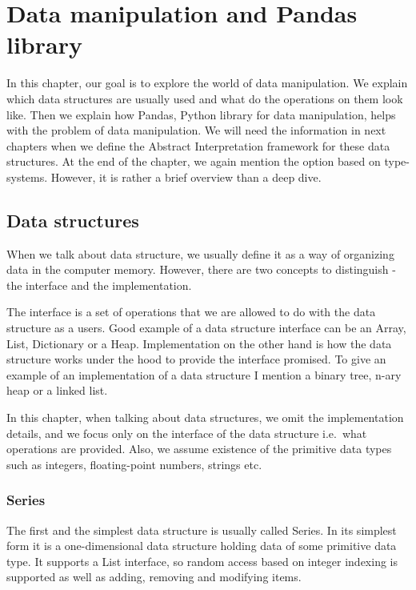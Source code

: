 \chapter{Data manipulation and Pandas library}

In this chapter, our goal is to explore the world of data manipulation.
We explain which data structures are usually used and what do the operations on them look like.
Then we explain how Pandas, Python library for data manipulation, helps with the problem of data manipulation.
We will need the information in next chapters when we define the Abstract Interpretation framework for these data
structures.
At the end of the chapter, we again mention the option based on type-systems.
However, it is rather a brief overview than a deep dive.


\section{Data structures} %

When we talk about data structure, we usually define it as a way of organizing data in the computer memory.
However, there are two concepts to distinguish - the interface and the implementation.

The interface is a set of operations that we are allowed to do with the data structure as a users.
Good example of a data structure interface can be an Array, List, Dictionary or a Heap.
Implementation on the other hand is how the data structure works under the hood to provide the interface promised.
To give an example of an implementation of a data structure I mention a binary tree, n-ary heap or a linked list.

In this chapter, when talking about data structures, we omit the implementation details, and we focus only on the
interface of the data structure i.e.\ what operations are provided.
Also, we assume existence of the primitive data types such as integers, floating-point numbers, strings etc.


\subsection{Series}

The first and the simplest data structure is usually called Series.
In its simplest form it is a one-dimensional data structure holding data of some primitive data type.
It supports a List interface, so random access based on integer indexing is supported as well as adding, removing and
modifying items.

